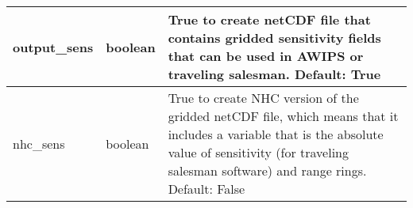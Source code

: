 \documentclass[psfig,12pt]{article}
\begin{document}
\begin{table}[H]
\begin{center}
\begin{tabular}{|p{1.60in}|p{0.5in}|p{4.15in}|}
output\_sens & boolean & True to create netCDF file that contains gridded sensitivity 
fields that can be used in AWIPS or traveling salesman.  Default:  True \\ \hline

nhc\_sens & boolean & True to create NHC version of the gridded netCDF file, which means that
it includes a variable that is the absolute value of sensitivity (for traveling salesman software)
and range rings.
Default:  False \\ \hline

\end{tabular}
\end{center}
\end{table}
\end{document}

